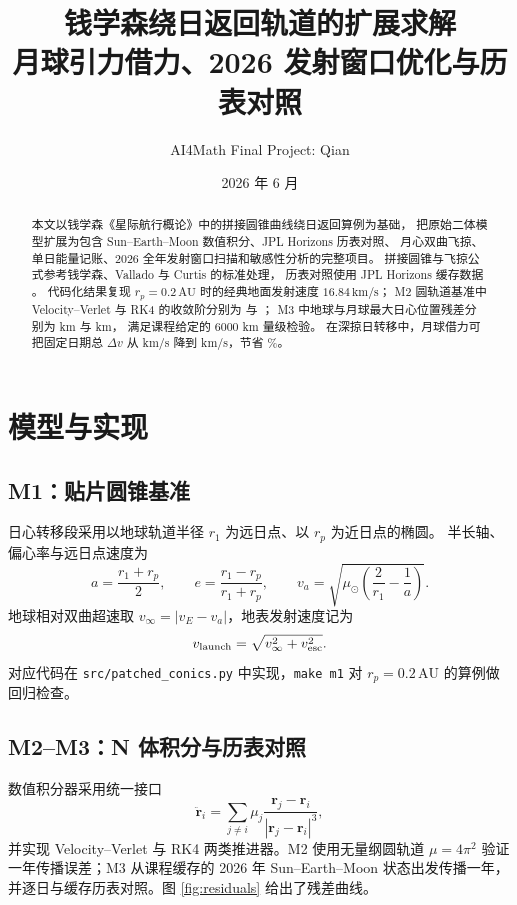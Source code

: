 \documentclass[12pt,a4paper]{ctexart}
\title{\heiti 钱学森绕日返回轨道的扩展求解\\
\large 月球引力借力、2026 发射窗口优化与历表对照}
\author{AI4Math Final Project: Qian}
\date{2026 年 6 月}
\begin{document}
\maketitle

\begin{abstract}
本文以钱学森《星际航行概论》中的拼接圆锥曲线绕日返回算例为基础，
把原始二体模型扩展为包含 Sun--Earth--Moon 数值积分、JPL Horizons 历表对照、
月心双曲飞掠、单日能量记账、2026 全年发射窗口扫描和敏感性分析的完整项目。
拼接圆锥与飞掠公式参考钱学森、Vallado 与 Curtis 的标准处理，
历表对照使用 JPL Horizons 缓存数据 \cite{qian2008,vallado2013,curtis2020,horizons}。
代码化结果复现 $r_p=0.2\,\mathrm{AU}$ 时的经典地面发射速度 $16.84\,\mathrm{km/s}$；
M2 圆轨道基准中 Velocity--Verlet 与 RK4 的收敛阶分别为
\MsevenVerletOrder{} 与 \MsevenRKOrder{}；
M3 中地球与月球最大日心位置残差分别为 \MthreeEarthMax{} km 与 \MthreeMoonMax{} km，
满足课程给定的 $6000$ km 量级检验。
在深掠日转移中，月球借力可把固定日期总 $\Delta v$ 从
\MfiveNoMoon{} km/s 降到 \MfiveWithMoon{} km/s，节省 \MfiveSavingPct\%。
\end{abstract}

\section{模型与实现}

\subsection{M1：贴片圆锥基准}

日心转移段采用以地球轨道半径 $r_1$ 为远日点、以 $r_p$ 为近日点的椭圆。
半长轴、偏心率与远日点速度为
\[
    a=\frac{r_1+r_p}{2},\qquad
    e=\frac{r_1-r_p}{r_1+r_p},\qquad
    v_a=\sqrt{\mu_\odot\left(\frac{2}{r_1}-\frac{1}{a}\right)}.
\]
地球相对双曲超速取 $v_\infty=|v_E-v_a|$，地表发射速度记为
\[
    v_{\rm launch}=\sqrt{v_\infty^2+v_{\rm esc}^2}.
\]
对应代码在 \texttt{src/patched\_conics.py} 中实现，\texttt{make m1} 对
$r_p=0.2\,\mathrm{AU}$ 的算例做回归检查。

\subsection{M2--M3：N 体积分与历表对照}

数值积分器采用统一接口
\[
    \ddot{\mathbf r}_i=\sum_{j\ne i}\mu_j
    \frac{\mathbf r_j-\mathbf r_i}{|\mathbf r_j-\mathbf r_i|^3},
\]
并实现 Velocity--Verlet 与 RK4 两类推进器。M2 使用无量纲圆轨道
$\mu=4\pi^2$ 验证一年传播误差；M3 从课程缓存的 2026 年 Sun--Earth--Moon
状态出发传播一年，并逐日与缓存历表对照。图 \ref{fig:residuals}
给出了残差曲线。
\end{document}
